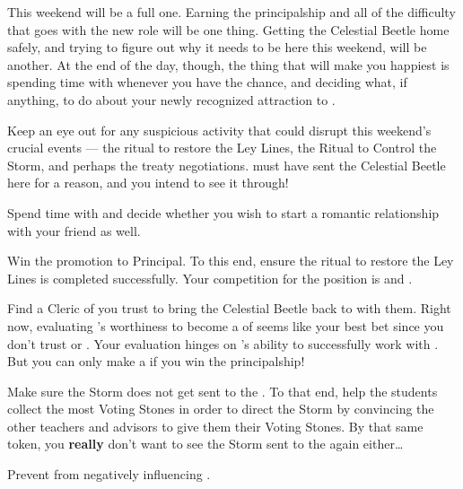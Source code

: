 \documentclass[char]{GL2020}
\begin{document}
This weekend will be a full one. Earning the principalship and all of the difficulty that goes with the new role will be one thing. Getting the Celestial Beetle home safely, and trying to figure out why it needs to be here this weekend, will be another. At the end of the day, though, the thing that will make you happiest is spending time with \cJuniorStatesman{} whenever you have the chance, and deciding what, if anything, to do about your newly recognized attraction to \cEthics{}.

\begin{itemz}
    \item Keep an eye out for any suspicious activity that could disrupt this weekend’s crucial events — the ritual to restore the Ley Lines, the Ritual to Control the Storm, and perhaps the treaty negotiations. \cTechGod{} must have sent the Celestial Beetle here for a reason, and you intend to see it through! 
    \item Spend time with \cJuniorStatesman{} and decide whether you wish to start a romantic relationship with your friend \cEthics{} as well.
    \item Win the promotion to Principal. To this end, ensure the ritual to restore the Ley Lines is completed successfully. Your competition for the position is \cMusic{} and \cChupSecond{}.
    \item Find a Cleric of \cTechGod{} you trust to bring the Celestial Beetle back to \pTech{} with them. Right now, evaluating \cHeadScientist{}'s worthiness to become a \cHeadScientist{\cleric} of \cTechGod{} seems like your best bet since you don’t trust \cAntiChup{} or \cScholarship{}. Your evaluation hinges on \cHeadScientist{}’s ability to successfully work with \cEbbPriest{}. But you can only make \cHeadScientist{} a \cHeadScientist{\cleric} if you win the principalship!
\end{itemz}

\begin{itemz}
    \item Make sure the Storm does not get sent to the \pTech{}. To that end, help the \pTech{} students collect the most Voting Stones in order to direct the Storm by convincing the other teachers and advisors to give them their Voting Stones. By that same token, you \textbf{really} don’t want to see the Storm sent to the \pShip{} again either\ldots 
    \item Prevent \cAmbition{} from negatively influencing \cHeir{}.
\end{itemz}
\end{document}
